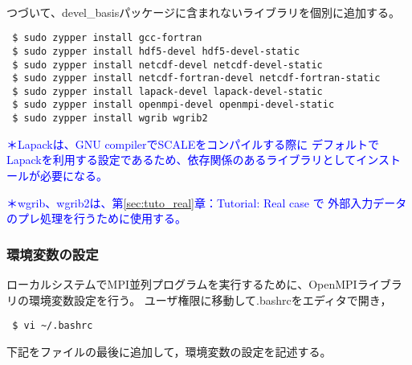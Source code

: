 {\small {\gt
{}}}\\

\noindent つづいて、devel\_basisパッケージに含まれないライブラリを個別に追加する。
\begin{verbatim}
 $ sudo zypper install gcc-fortran
 $ sudo zypper install hdf5-devel hdf5-devel-static
 $ sudo zypper install netcdf-devel netcdf-devel-static
 $ sudo zypper install netcdf-fortran-devel netcdf-fortran-static
 $ sudo zypper install lapack-devel lapack-devel-static
 $ sudo zypper install openmpi-devel openmpi-devel-static
 $ sudo zypper install wgrib wgrib2
\end{verbatim}

\noindent \textcolor{blue}{\small ＊Lapackは、GNU compilerでSCALEをコンパイルする際に
デフォルトでLapackを利用する設定であるため、依存関係のあるライブラリとしてインストールが必要になる。}

\noindent \textcolor{blue}{\small ＊wgrib、wgrib2は、第\ref{sec:tuto_real}章：Tutorial: Real case で
外部入力データのプレ処理を行うために使用する。}


\subsubsection{環境変数の設定}

ローカルシステムでMPI並列プログラムを実行するために、OpenMPIライブラリの環境変数設定を行う。
ユーザ権限に移動して.bashrcをエディタで開き，
\begin{verbatim}
 $ vi ~/.bashrc
\end{verbatim}
下記をファイルの最後に追加して，環境変数の設定を記述する。\\

{\gt
{}}\\

